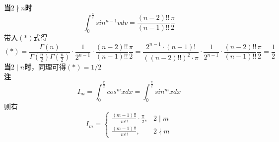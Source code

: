 \documentclass[a4paper]{ctexart}    %
\begin{document}
	\textbf{当$2 \nmid n$时}
	\begin{equation*}
		\int_{0}^{\frac{\pi}{2}} sin^{n-1}vdv = \frac{(n-2)!!}{(n-1)!!}\frac{\pi}{2}
	\end{equation*}
	带入$(*)$式得
	\begin{equation*}
		(*) = \frac{\Gamma(n)}{\Gamma\left(\frac{n}{2}\right)\Gamma\left(\frac{n}{2}\right)} \cdot \frac{1}{2^{n-1}} \cdot \frac{(n-2)!!}{(n-1)!!}\frac{\pi}{2} = \frac{2^{n-1}\cdot (n-1)!}{((n-2)!!)^2\cdot \pi} \cdot \frac{1}{2^{n-1}} \cdot \frac{(n-2)!!}{(n-1)!!}\frac{\pi}{2} = \frac{1}{2}
	\end{equation*}
	\textbf{当$2\mid n$时}，同理可得$(*) = 1/2$
	\[\qquad \]
	\textbf{注} \\
	\begin{equation*}
		I_m = \int_{0}^{\frac{\pi}{2}} cos^{m}xdx = \int_{0}^{\frac{\pi}{2}} sin^{m}xdx
	\end{equation*}
	则有
	\begin{equation*}
		I_{m} = 
		\begin{cases}
			\frac{(m-1)!!}{m!!} \cdot \frac{\pi}{2}, & 2 \mid m \\
			\frac{(m-1)!!}{m!!}, & 2 \nmid m
		\end{cases}
	\end{equation*}
	\newpage 
\end{document}

